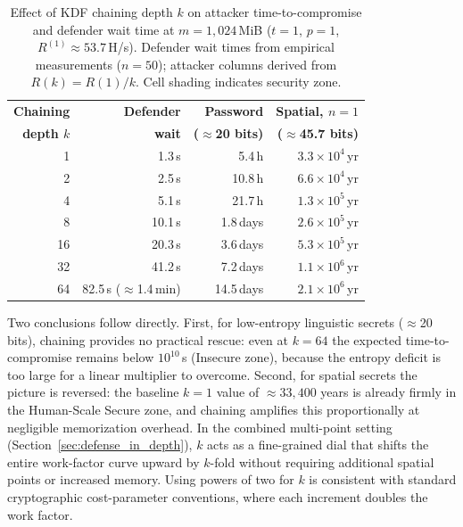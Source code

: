\documentclass[journal,article,accept,pdftex,moreauthors]{Definitions/mdpi}
\begin{document}
\begin{table}[H]
\caption{Effect of KDF chaining depth $k$ on attacker time-to-compromise and defender wait time at $m=1{,}024$\,MiB ($t=1$, $p=1$, $R^{(1)}\approx53.7$\,H/s). Defender wait times from empirical measurements ($n=50$); attacker columns derived from $R(k)=R(1)/k$. Cell shading indicates security zone.}
\label{tab:k_chaining_effect}
\centering
\begin{tabular}{rrrr}
\toprule
\textbf{Chaining} & \textbf{Defender} & \textbf{Password} & \textbf{Spatial, $n=1$} \\
\textbf{depth $k$} & \textbf{wait} & \textbf{($\approx$20 bits)} & \textbf{($\approx$45.7 bits)} \\
\midrule
 1 &  1.3\,s & \cellcolor{insecure}5.4\,h    & \cellcolor{humanscale}$3.3\times10^{4}$\,yr \\
 2 &  2.5\,s & \cellcolor{insecure}10.8\,h   & \cellcolor{humanscale}$6.6\times10^{4}$\,yr \\
 4 &  5.1\,s & \cellcolor{insecure}21.7\,h   & \cellcolor{humanscale}$1.3\times10^{5}$\,yr \\
 8 & 10.1\,s & \cellcolor{insecure}1.8\,days  & \cellcolor{humanscale}$2.6\times10^{5}$\,yr \\
16 & 20.3\,s & \cellcolor{insecure}3.6\,days  & \cellcolor{humanscale}$5.3\times10^{5}$\,yr \\
32 & 41.2\,s & \cellcolor{insecure}7.2\,days  & \cellcolor{humanscale}$1.1\times10^{6}$\,yr \\
64 & 82.5\,s ($\approx$1.4\,min) & \cellcolor{insecure}14.5\,days & \cellcolor{humanscale}$2.1\times10^{6}$\,yr \\
\bottomrule
\end{tabular}
\end{table}

Two conclusions follow directly. First, for low-entropy linguistic secrets ($\approx$20 bits), chaining provides no practical rescue: even at $k=64$ the expected time-to-compromise remains below $10^{10}$\,s (Insecure zone), because the entropy deficit is too large for a linear multiplier to overcome. Second, for spatial secrets the picture is reversed: the baseline $k=1$ value of $\approx\!33{,}400$ years is already firmly in the Human-Scale Secure zone, and chaining amplifies this proportionally at negligible memorization overhead. In the combined multi-point setting (Section~\ref{sec:defense_in_depth}), $k$ acts as a fine-grained dial that shifts the entire work-factor curve upward by $k$-fold without requiring additional spatial points or increased memory. Using powers of two for $k$ is consistent with standard cryptographic cost-parameter conventions, where each increment doubles the work factor.
\end{document}
